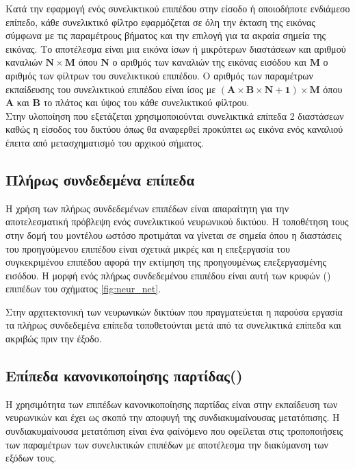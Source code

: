 Κατά την εφαρμογή ενός συνελικτικού επιπέδου στην είσοδο ή οποιοδήποτε ενδιάμεσο επίπεδο, κάθε συνελικτικό φίλτρο εφαρμόζεται σε όλη την έκταση της εικόνας σύμφωνα με τις παραμέτρους βήματος και την επιλογή για τα ακραία σημεία της εικόνας. Το αποτέλεσμα είναι μια εικόνα ίσων ή μικρότερων διαστάσεων και αριθμού καναλιών $\mathbf{N\times M}$ όπου $\mathbf{N}$ ο αριθμός των καναλιών της εικόνας εισόδου και $\mathbf{M}$ ο αριθμός των φίλτρων του συνελικτικού επιπέδου. Ο αριθμός των παραμέτρων εκπαίδευσης του συνελικτικού επιπέδου είναι ίσος με $\mathbf{\left(A \times B\times N+1\right)\times M}$ όπου $\mathbf{A}$ και $\mathbf{B}$ το πλάτος και ύψος του κάθε συνελικτικού φίλτρου.\\

Στην υλοποίηση που εξετάζεται χρησιμοποιούνται συνελικτικά επίπεδα 2 διαστάσεων καθώς η είσοδος του δικτύου όπως θα αναφερθεί προκύπτει ως εικόνα ενός καναλιού έπειτα από μετασχηματισμό του αρχικού σήματος.

\subsection{Πλήρως συνδεδεμένα επίπεδα}
Η χρήση των πλήρως συνδεδεμένων επιπέδων είναι απαραίτητη για την αποτελεσματική πρόβλεψη ενός συνελικτικού νευρωνικού δικτύου. Η τοποθέτηση τους στην δομή του μοντέλου ωστόσο προτιμάται να γίνεται σε σημεία όπου η διαστάσεις του προηγούμενου επιπέδου είναι σχετικά μικρές και η επεξεργασία του συγκεκριμένου επιπέδου αφορά την εκτίμηση της προηγουμένως επεξεργασμένης εισόδου. Η μορφή ενός πλήρως συνδεδεμένου επιπέδου είναι αυτή των κρυφών (\textbf{}) επιπέδων του σχήματος \ref{fig:neur_net}.

Στην αρχιτεκτονική των νευρωνικών δικτύων που πραγματεύεται η παρούσα εργασία τα πλήρως συνδεδεμένα επίπεδα τοποθετούνται μετά από τα συνελικτικά επίπεδα και ακριβώς πριν την έξοδο.

\subsection{Επίπεδα κανονικοποίησης παρτίδας()}
Η χρησιμότητα των επιπέδων κανονικοποίησης παρτίδας είναι στην εκπαίδευση των νευρωνικών και έχει ως σκοπό την αποφυγή της συνδιακυμαίνουσας μετατόπισης. Η συνδιακυμαίνουσα μετατόπιση είναι ένα φαίνόμενο που οφείλεται στις τροποποιήσεις των παραμέτρων των συνελικτικών επιπέδων με αποτέλεσμα την διακύμανση των εξόδων τους.\\

